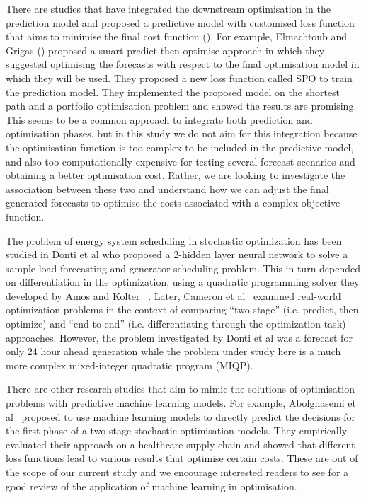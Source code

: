 \documentclass[conference]{IEEEtran}
\begin{document}
There are studies that have integrated the downstream optimisation in the prediction model and proposed a predictive model with customised loss function that aims to minimise the final cost function (\cite{Bergman2022, demirovic}). For example, Elmachtoub and Grigas (\cite{Elmachtoub}) proposed a smart predict then optimise approach in which they suggested optimising the forecasts with respect to the final optimisation model in which they will be used.  They proposed a new loss function called SPO to train the prediction model. They implemented the proposed model on the shortest path and a portfolio optimisation problem and showed the results are promising. This seems to be a common approach to integrate both prediction and optimisation phases, but in this study we do not aim for this integration because the optimisation function is too complex to be included in the predictive model, and also too computationally expensive for testing several forecast scenarios and obtaining a better optimisation cost. Rather, we are looking to investigate the association between these two and understand how we can adjust the final generated forecasts to optimise the costs associated with a complex objective function. 

The problem of energy system scheduling in stochastic optimization has been studied in Donti et al \cite{donti} who proposed a 2-hidden layer neural network to solve a sample load forecasting and generator scheduling problem. This in turn depended on differentiation in the optimization, using a quadratic programming solver they developed by Amos and Kolter ~\cite{amos}. Later, Cameron et al~\cite{cameron} examined real-world optimization problems in the context of comparing ``two-stage'' (i.e. predict, then optimize) and ``end-to-end'' (i.e. differentiating through the optimization task) approaches. However, the problem investigated by Donti et al was a forecast for only 24 hour ahead generation while the problem under study here is a much more complex mixed-integer quadratic program (MIQP).

There are other research studies that aim to mimic the solutions of optimisation problems with predictive machine learning models. For example, Abolghasemi et al~\cite{abolghasemi2021effectively} proposed to use machine learning models to directly predict the decisions for the first phase of a two-stage stochastic optimisation models. They empirically evaluated their approach on a healthcare supply chain and showed that different loss functions lead to various results that optimise certain costs. These are out of the scope of our current study and we encourage interested readers to see \cite{Bengio} for a good review of the application of machine learning in optimisation.
\end{document}
